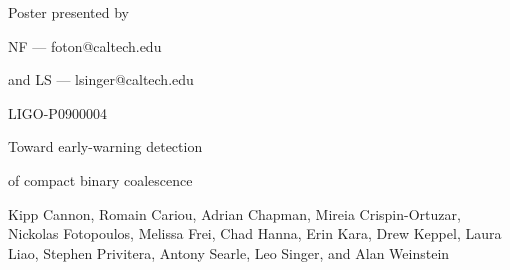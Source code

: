 \documentclass[portrait,plainboxedsections]{sciposter}
\begin{document}
\begin{minipage}[b]{0.25\textwidth}
\raggedleft
{\fontsize{36}{50}\selectfont
Poster presented by

NF --- foton@caltech.edu

and LS --- lsinger@caltech.edu

}
\vspace{32mm}

\fontsize{36}{40}\selectfont
LIGO-P0900004
\end{minipage}%
\hspace{0.05\textwidth}%
\begin{minipage}[b]{0.6\textwidth}
{\fontsize{80}{100}\selectfont%
Toward early-warning detection

of compact binary coalescence

\vspace{0.5em}
\fontsize{30}{40}\selectfont
	Kipp Cannon,
	Romain Cariou,
	Adrian Chapman,
	Mireia Crispin-Ortuzar,
	Nickolas Fotopoulos,
	Melissa Frei,
	Chad Hanna,
	Erin Kara,
	Drew Keppel,
	Laura Liao,
	Stephen Privitera,
	Antony Searle,
	Leo Singer, and
	Alan Weinstein

}
\end{minipage}
\vspace{1cm}
\end{document}
